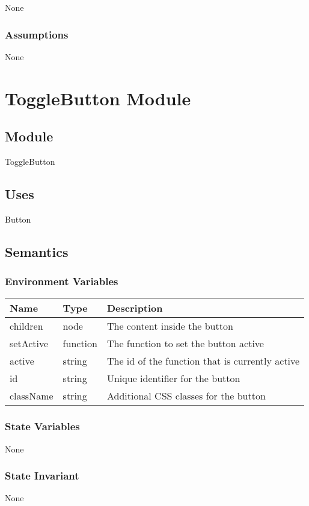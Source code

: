 \documentclass[12pt]{article}
\begin{document}
None

\subsubsection{Assumptions}

None

\newpage

\section{ToggleButton Module}

\subsection{Module}
ToggleButton

\subsection{Uses}
Button

\subsection{Semantics}


\subsubsection{Environment Variables}
\begin{tabular}{| l | l | p{8cm} |}
    \hline
    \textbf{Name} & \textbf{Type} & \textbf{Description}\\ \hline
    children & node & The content inside the button\\ \hline
    setActive & function & The function to set the button active\\ \hline
    active & string & The id of the function that is currently active\\ \hline
    id & string & Unique identifier for the button\\ \hline
    className & string & Additional CSS classes for the button\\ \hline
\end{tabular}

\subsubsection{State Variables}
None

\subsubsection{State Invariant}
None
\end{document}
